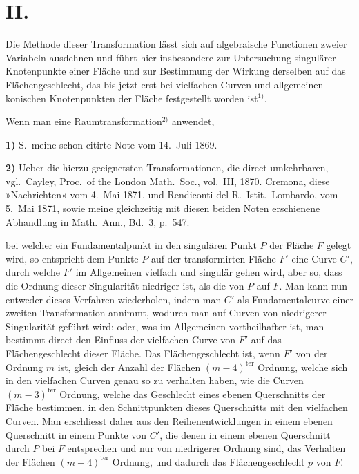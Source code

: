 \documentclass{article}
\begin{document}
\section*{II.}

Die Methode dieser Transformation lässt sich auf algebraische Functionen zweier Variabeln ausdehnen und führt hier insbesondere zur Untersuchung singulärer Knotenpunkte einer Fläche und zur Bestimmung der Wirkung derselben auf das Flächengeschlecht, das bis jetzt erst bei vielfachen Curven und allgemeinen konischen Knotenpunkten der Fläche festgestellt worden ist${}^{1)}$.

Wenn man eine Raumtransformation${}^{2)}$ anwendet,

\textbf{1)} S.\ meine schon citirte Note vom 14.\ Juli 1869.

\textbf{2)} Ueber die hierzu geeignetsten Transformationen, die direct umkehrbaren, vgl.\ Cayley, Proc.\ of the London Math.\ Soc., vol.\ III, 1870.
Cremona, diese »Nachrichten« vom 4.\ Mai 1871, und Rendiconti del R.\ Istit.\ Lombardo, vom 5.\ Mai 1871, sowie meine gleichzeitig mit diesen beiden Noten erschienene Abhandlung in Math.\ Ann., Bd.\ 3, p.\ 547.

bei welcher ein Fundamentalpunkt in den singulären Punkt $P$ der Fläche $F$ gelegt wird, so entspricht dem Punkte $P$ auf der transformirten Fläche $F'$ eine Curve $C'$, durch welche $F'$ im Allgemeinen vielfach und singulär gehen wird, aber so, dass die Ordnung dieser Singularität niedriger ist, als die von $P$ auf $F$. Man kann nun entweder dieses Verfahren wiederholen, indem man $C'$ als Fundamentalcurve einer zweiten Transformation annimmt, wodurch man auf Curven von niedrigerer Singularität geführt wird; oder, was im Allgemeinen vortheilhafter ist, man bestimmt direct den Einfluss der vielfachen Curve von $F'$ auf das Flächengeschlecht dieser Fläche. Das Flächengeschlecht ist, wenn $F'$ von der Ordnung $m$ ist, gleich der Anzahl der Flächen $(m-4)^{\text{ter}}$ Ordnung, welche sich in den vielfachen Curven genau so zu verhalten haben, wie die Curven $(m-3)^{\text{ter}}$ Ordnung, welche das Geschlecht eines ebenen Querschnitts der Fläche bestimmen, in den Schnittpunkten dieses Querschnitts mit den vielfachen Curven. Man erschliesst daher aus den Reihenentwicklungen in einem ebenen Querschnitt in einem Punkte von $C'$, die denen in einem ebenen Querschnitt durch $P$ bei $F$ entsprechen und nur von niedrigerer Ordnung sind, das Verhalten der Flächen $(m-4)^{\text{ter}}$ Ordnung, und dadurch das Flächengeschlecht $p$ von $F$.
\end{document}
